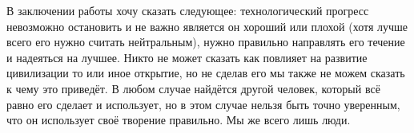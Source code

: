 В заключении работы хочу сказать следующее: технологический прогресс 
невозможно остановить и не важно является он хороший или плохой (хотя лучше 
всего его нужно считать нейтральным), нужно правильно направлять его течение и 
надеяться на лучшее. Никто не может сказать как повлияет на развитие 
цивилизации то или иное открытие, но не сделав его мы также не можем сказать к 
чему это приведёт. В любом случае найдётся другой человек, который всё равно 
его сделает и использует, но в этом случае нельзя быть точно уверенным, что он 
использует своё творение правильно. Мы же всего лишь люди.

\newpage